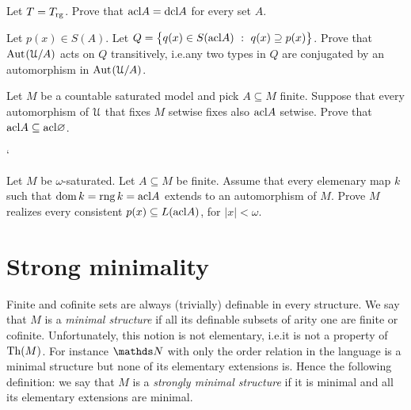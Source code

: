 \begin{exercise}\label{ex_acl_rg}
  Let $T=T_{\rm rg}$.
  Prove that ${\rm acl} A={\rm dcl} A$ for every set $A$.
\end{exercise} 

\begin{exercise}\label{ex_trans_action_on_Q}
  Let $p(x)\in S(A)$.
  Let $Q=\big\{q(x)\in S(\acl A)\ :\ q(x)\supseteq p(x)\big\}$.
  Prove that ${\rm Aut\kern.15ex}(\EuScript U/A)$ acts on $Q$ transitively, i.e.\@ any two types in $Q$ are conjugated by an automorphism in ${\rm Aut\kern.15ex}(\EuScript U/A)$.
\end{exercise}

\begin{exercise}
  Let $M$ be a countable saturated model and pick $A\subseteq M$ finite.
  Suppose that every automorphism of $\EuScript U$ that fixes $M$ setwise fixes also ${\rm acl} A$ setwise.
  Prove that ${\rm acl} A\subseteq {\rm acl}\varnothing$.
\end{exercise}
`
\begin{exercise}
Let $M$ be $\omega$-saturated.
Let $A\subseteq M$ be finite.
Assume that every elemenary map $k$ such that $\mathop{\rm dom} k=\mathop{\rm rng} k={\rm acl} A$ extends to an automorphism of $M$.
Prove $M$ realizes every consistent $p(x)\subseteq L({\rm acl} A)$, for $|x|<\omega$.
\end{exercise}

\section{Strong minimality\label{tfm}}
 
\def\medrel#1{\parbox[t]{5ex}{$\displaystyle\hfil #1$}}
\def\ceq#1#2#3{\parbox{15ex}{$\displaystyle #1$}\medrel{#2}$\displaystyle  #3$}

Finite and cofinite sets are always (trivially) definable in every structure.
We say that $M$ is a \emph{minimal structure\/} if all its definable subsets of arity one are finite or cofinite.
Unfortunately, this notion is not elementary, i.e.\@ it is not a property of ${\rm Th}(M)$.
For instance $\NN$ with only the order relation in the language is a minimal structure but 
none of its elementary extensions is.
Hence the following definition: 
we say that $M$ is a \emph{strongly minimal structure\/} if it is minimal and all its elementary extensions are minimal.

